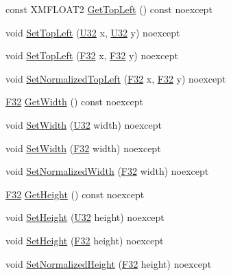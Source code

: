 \begin{DoxyCompactItemize}
\item 
const X\+M\+F\+L\+O\+A\+T2 \hyperlink{classmage_1_1_viewport_a778f561a002a8223820dc4ea4f3ec281}{Get\+Top\+Left} () const noexcept
\item 
void \hyperlink{classmage_1_1_viewport_a14f63922d0bd2613b3fc2b86683f13a7}{Set\+Top\+Left} (\hyperlink{namespacemage_a41c104c036fba3756a74e19f793eeaa1}{U32} x, \hyperlink{namespacemage_a41c104c036fba3756a74e19f793eeaa1}{U32} y) noexcept
\item 
void \hyperlink{classmage_1_1_viewport_a982a30c583445f04516cfae876667e62}{Set\+Top\+Left} (\hyperlink{namespacemage_aa97e833b45f06d60a0a9c4fc22ae02c0}{F32} x, \hyperlink{namespacemage_aa97e833b45f06d60a0a9c4fc22ae02c0}{F32} y) noexcept
\item 
void \hyperlink{classmage_1_1_viewport_a6f85757d3b7e09e9e7cb72c201fd0cd4}{Set\+Normalized\+Top\+Left} (\hyperlink{namespacemage_aa97e833b45f06d60a0a9c4fc22ae02c0}{F32} x, \hyperlink{namespacemage_aa97e833b45f06d60a0a9c4fc22ae02c0}{F32} y) noexcept
\item 
\hyperlink{namespacemage_aa97e833b45f06d60a0a9c4fc22ae02c0}{F32} \hyperlink{classmage_1_1_viewport_a851c6322e8ee31af58309a3c0f382d10}{Get\+Width} () const noexcept
\item 
void \hyperlink{classmage_1_1_viewport_a13f5587df2929ca0368e4434a3a45753}{Set\+Width} (\hyperlink{namespacemage_a41c104c036fba3756a74e19f793eeaa1}{U32} width) noexcept
\item 
void \hyperlink{classmage_1_1_viewport_a377016fb769c86677d7a17c2b19960f3}{Set\+Width} (\hyperlink{namespacemage_aa97e833b45f06d60a0a9c4fc22ae02c0}{F32} width) noexcept
\item 
void \hyperlink{classmage_1_1_viewport_af79a62d7996eb67cf9be99e3e7258f6a}{Set\+Normalized\+Width} (\hyperlink{namespacemage_aa97e833b45f06d60a0a9c4fc22ae02c0}{F32} width) noexcept
\item 
\hyperlink{namespacemage_aa97e833b45f06d60a0a9c4fc22ae02c0}{F32} \hyperlink{classmage_1_1_viewport_ac763e089bbff0ee3f67b47c0501637ef}{Get\+Height} () const noexcept
\item 
void \hyperlink{classmage_1_1_viewport_abe55d91495584c60ff1bc91a7f286329}{Set\+Height} (\hyperlink{namespacemage_a41c104c036fba3756a74e19f793eeaa1}{U32} height) noexcept
\item 
void \hyperlink{classmage_1_1_viewport_a70a89b84a3dbe79475e10b4a61c0a34c}{Set\+Height} (\hyperlink{namespacemage_aa97e833b45f06d60a0a9c4fc22ae02c0}{F32} height) noexcept
\item 
void \hyperlink{classmage_1_1_viewport_ad1516859277f8d872ce59e24dd525d5d}{Set\+Normalized\+Height} (\hyperlink{namespacemage_aa97e833b45f06d60a0a9c4fc22ae02c0}{F32} height) noexcept

\end{DoxyCompactItemize}

